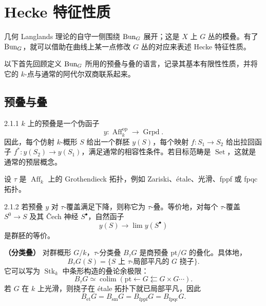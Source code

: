 \chapter{Hecke 特征性质}\label{ch:2}
几何 Langlands 理论的自守一侧围绕 $\operatorname{Bun}_G$ 展开；这是 $X$ 上 $G$ 丛的模叠。有了 $\operatorname{Bun}_G$，就可以借助在曲线上某一点修改 $G$ 丛的对应来表述 Hecke 特征性质。

以下首先回顾定义 $\operatorname{Bun}_G$ 所用的预叠与叠的语言，记录其基本有限性性质，并将它的 $k$-点与通常的阿代尔双商联系起来。
\section{预叠与叠}\label{sec:2.1}
\begin{definition}{}{2.1.1}
$k$ 上的预叠是一个伪函子
\[y:\operatorname{Aff}_k^{\mathrm{op}}\longrightarrow\operatorname{Grpd}.\]
因此，每个仿射 $k$-概形 $S$ 给出一个群胚 $y(S)$，每个映射 $f:S_1\to S_2$ 给出拉回函子 $f^*:y(S_2)\to y(S_1)$，满足通常的相容性条件。若目标范畴是 $\operatorname{Set}$，这就是通常的预层概念。
\end{definition}

设 $\tau$ 是 $\operatorname{Aff}_k$ 上的 Grothendieck 拓扑，例如 Zariski、étale、光滑、fppf 或 fpqc 拓扑。
\begin{definition}{}{2.1.2}
若预叠 $y$ 对 $\tau$-覆盖满足下降，则称它为 $\tau$-叠。等价地，对每个 $\tau$-覆盖 $S^0\to S$ 及其 Čech 神经 $S^\bullet$，自然函子
\[y(S)\longrightarrow\lim y(S^\bullet)\]
是群胚的等价。
\end{definition}
\begin{note}\textbf{（分类叠）}
对群概形 $G/k$，$\tau$-分类叠 $B_\tau G$ 是商预叠 $\mathrm{pt}/G$ 的叠化。具体地，
\[B_\tau G(S)=\{S\text{ 上 }\tau\text{-局部平凡的 }G\text{ 挠子}\}.\]
它可以写为 $\operatorname{Stk}_k$ 中条形构造的叠论余极限：
\[B_\tau G\simeq\operatorname*{colim}(\mathrm{pt}\leftarrow G\leftleftarrows G\times G\cdots).\]
若 $G$ 在 $k$ 上光滑，则挠子在 étale 拓扑下就已局部平凡，因此
\[B_{\mathrm{et}}G=B_{\mathrm{sm}}G=B_{\mathrm{fppf}}G=B_{\mathrm{fpqc}}G.\]
\end{note}
